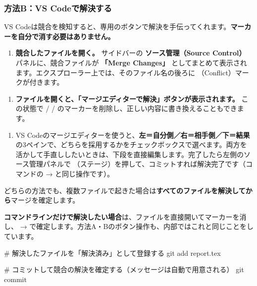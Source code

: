 \subsubsection{方法B：VS Codeで解決する}

VS Codeは競合を検知すると、専用のボタンで解決を手伝ってくれます。\textbf{マーカーを自分で消す必要はありません。}

\begin{enumerate}[leftmargin=1.6em]
  \item \textbf{競合したファイルを開く。} サイドバーの \textbf{ソース管理（Source Control）} パネルに、競合ファイルが \textbf{「Merge Changes」} としてまとめて表示されます。エクスプローラー上では、そのファイル名の後ろに \cmd{!}（Conflict）マークが付きます。
\end{enumerate}

\begin{enumerate}[leftmargin=1.6em, start=2]
  \item \textbf{ファイルを開くと、「マージエディターで解決」ボタンが表示されます。} この状態で \cmd{<<<<<<<} / \cmd{=======} / \cmd{>>>>>>>} のマーカーを削除し、正しい内容に書き換えることもできます。
\end{enumerate}

\begin{enumerate}[leftmargin=1.6em, start=3]
  \item VS Codeのマージエディターを使うと、\textbf{左＝自分側／右＝相手側／下＝結果}の3ペインで、どちらを採用するかをチェックボックスで選べます。両方を活かして手直ししたいときは、下段を直接編集します。完了したら左側のソース管理パネルで \cmd{+}（ステージ）を押して、コミットすれば解決完了です（コマンドの  →  と同じ操作です）。
\end{enumerate}

どちらの方法でも、複数ファイルで起きた場合は\textbf{すべてのファイルを解決してから}マージを確定します。

\begin{hintbox}
\textbf{コマンドラインだけで解決したい場合}は、ファイルを直接開いてマーカーを消し、 →  で確定します。方法A・Bのボタン操作も、内部ではこれと同じことをしています。
\begin{codebox}[bash]
\begin{code}
# 解決したファイルを「解決済み」として登録する
git add report.tex

# コミットして競合の解決を確定する（メッセージは自動で用意される）
git commit
\end{code}
\end{codebox}
\end{hintbox}

